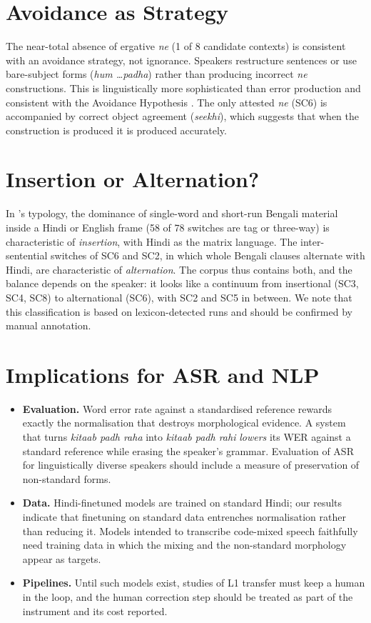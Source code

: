 \documentclass[11pt,a4paper]{report}
\begin{document}
\section{Avoidance as Strategy}

The near-total absence of ergative \textit{ne} (1 of 8 candidate contexts) is consistent with an avoidance strategy, not ignorance. Speakers restructure sentences or use bare-subject forms (\textit{hum \ldots padha}) rather than producing incorrect \textit{ne} constructions. This is linguistically more sophisticated than error production and consistent with the Avoidance Hypothesis \citep{schachter1974}. The only attested \textit{ne} (SC6) is accompanied by correct object agreement (\textit{seekhi}), which suggests that when the construction is produced it is produced accurately.

\section{Insertion or Alternation?}

In \citeauthor{muysken2000bilingual}'s typology, the dominance of single-word and short-run Bengali material inside a Hindi or English frame (58 of 78 switches are tag or three-way) is characteristic of \emph{insertion}, with Hindi as the matrix language. The inter-sentential switches of SC6 and SC2, in which whole Bengali clauses alternate with Hindi, are characteristic of \emph{alternation}. The corpus thus contains both, and the balance depends on the speaker: it looks like a continuum from insertional (SC3, SC4, SC8) to alternational (SC6), with SC2 and SC5 in between. We note that this classification is based on lexicon-detected runs and should be confirmed by manual annotation.

\section{Implications for ASR and NLP}

\begin{itemize}
  \item \textbf{Evaluation.} Word error rate against a standardised reference rewards exactly the normalisation that destroys morphological evidence. A system that turns \textit{kitaab padh raha} into \textit{kitaab padh rahi} \emph{lowers} its WER against a standard reference while erasing the speaker's grammar. Evaluation of ASR for linguistically diverse speakers should include a measure of preservation of non-standard forms.
  \item \textbf{Data.} Hindi-finetuned models are trained on standard Hindi; our results indicate that finetuning on standard data entrenches normalisation rather than reducing it. Models intended to transcribe code-mixed speech faithfully need training data in which the mixing and the non-standard morphology appear as targets.
  \item \textbf{Pipelines.} Until such models exist, studies of L1 transfer must keep a human in the loop, and the human correction step should be treated as part of the instrument and its cost reported.
\end{itemize}
\end{document}
